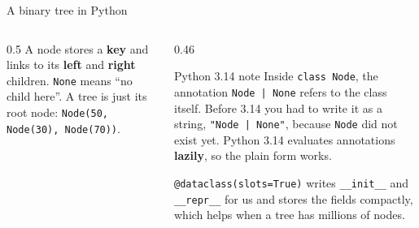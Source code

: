 \documentclass[aspectratio=169,10pt]{beamer}
\begin{document}
\begin{frame}{A binary tree in Python}
\begin{columns}[T]
\begin{column}{0.5\textwidth}
\vspace{3mm}
{\small
A node stores a \textbf{key} and links to its \textbf{left} and \textbf{right} children. \texttt{None} means ``no child here''. A tree is just its root node: \texttt{Node(50, Node(30), Node(70))}.}
\end{column}
\begin{column}{0.46\textwidth}
\begin{block}{Python 3.14 note}
{\small
Inside \texttt{class Node}, the annotation \texttt{Node | None} refers to the class itself. Before 3.14 you had to write it as a string, \texttt{"Node | None"}, because \texttt{Node} did not exist yet. Python 3.14 evaluates annotations \textbf{lazily}, so the plain form works.}
\end{block}
\vspace{2mm}
{\small
\texttt{@dataclass(slots=True)} writes \texttt{\_\_init\_\_} and \texttt{\_\_repr\_\_} for us and stores the fields compactly, which helps when a tree has millions of nodes.}
\end{column}
\end{columns}
\end{frame}
\end{document}
